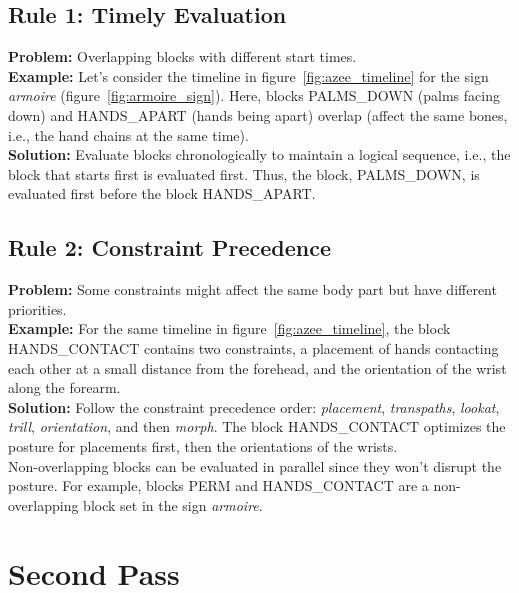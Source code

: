 \documentclass[../../main.tex]{subfiles}
\begin{document}
\subsection{Rule 1: Timely Evaluation}
\label{ch:multi_track:resolve_conflicts:rule1}

\textbf{Problem:} Overlapping blocks with different start times. \\

\textbf{Example:} Let's consider the timeline in figure~\ref{fig:azee_timeline} for the sign \emph{armoire} (figure~\ref{fig:armoire_sign}). Here, blocks PALMS\_DOWN (palms facing down) and HANDS\_APART (hands being apart) overlap (affect the same bones, i.e., the hand chains at the same time).  \\

\textbf{Solution:} Evaluate blocks chronologically to maintain a logical sequence, i.e., the block that starts first is evaluated first. Thus, the block, PALMS\_DOWN, is evaluated first before the block HANDS\_APART.  \\

\subsection{Rule 2: Constraint Precedence}
\label{ch:multi_track:resolve_conflicts:rule2}

\textbf{Problem:} Some constraints might affect the same body part but have different priorities. \\

\textbf{Example:} For the same timeline in figure~\ref{fig:azee_timeline}, the block HANDS\_CONTACT contains two constraints, a placement of hands contacting each other at a small distance from the forehead, and the orientation of the wrist along the forearm. \\

\textbf{Solution:} Follow the constraint precedence order: \emph{placement}, \emph{transpaths}, \emph{lookat}, \emph{trill}, \emph{orientation}, and then \emph{morph}. The block HANDS\_CONTACT optimizes the posture for placements first, then the orientations of the wrists. \\

Non-overlapping blocks can be evaluated in parallel since they won't disrupt the posture. For example, blocks PERM and HANDS\_CONTACT are a non-overlapping block set in the sign \emph{armoire}.

\section{Second Pass}
\label{ch:multi_track:second_pass}
\end{document}
